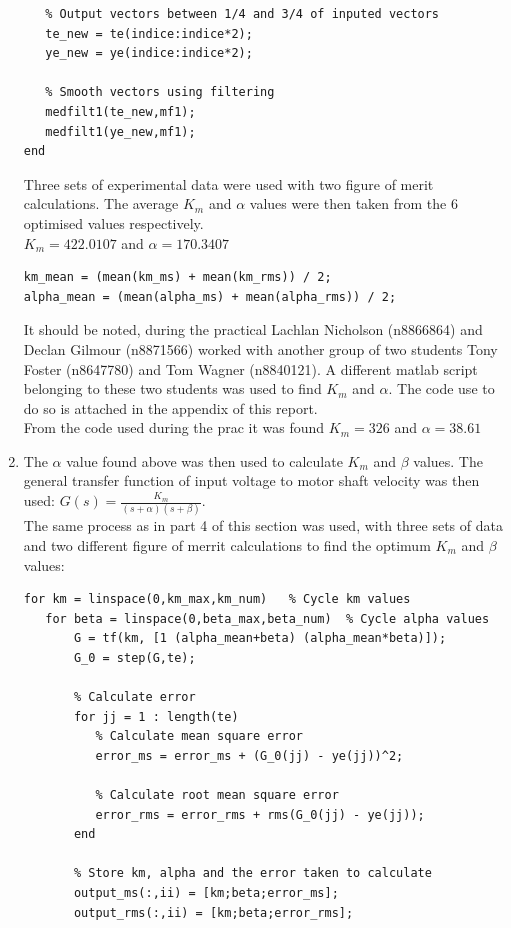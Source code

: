 \documentclass[11pt,a4paper]{article}
\begin{document}
\begin{enumerate}
\begin{lstlisting}
   % Output vectors between 1/4 and 3/4 of inputed vectors
   te_new = te(indice:indice*2);
   ye_new = ye(indice:indice*2);
   
   % Smooth vectors using filtering
   medfilt1(te_new,mf1);
   medfilt1(ye_new,mf1);   
end
	\end{lstlisting}
	Three sets of experimental data were used with two figure of merit calculations. The average $K_m$ and $\alpha$ values were then taken from the 6 optimised values respectively.\\
	$K_m = 422.0107$ and $\alpha = 170.3407$
	\begin{lstlisting}
km_mean = (mean(km_ms) + mean(km_rms)) / 2;
alpha_mean = (mean(alpha_ms) + mean(alpha_rms)) / 2;
	\end{lstlisting} 
	It should be noted, during the practical Lachlan Nicholson (n8866864) and Declan Gilmour (n8871566) worked with another group of two students Tony Foster (n8647780) and Tom Wagner (n8840121). A different matlab script belonging to these two students was used to find $K_m$ and $\alpha$. The code use to do so is attached in the appendix of this report.\\
	From the code used during the prac it was found $K_m = 326$ and $\alpha = 38.61$
\pagebreak
	\item The $\alpha$ value found above was then used to calculate $K_m$ and $\beta$ values. The general transfer function of input voltage to motor shaft velocity was then used: $G(s) = \frac{K_m}{(s+\alpha)(s+\beta)}$.\\
	The same process as in part 4 of this section was used, with three sets of data and two different figure of merrit calculations to find the optimum $K_m$ and $\beta$ values:
	\begin{lstlisting}
for km = linspace(0,km_max,km_num)   % Cycle km values
   for beta = linspace(0,beta_max,beta_num)  % Cycle alpha values
       G = tf(km, [1 (alpha_mean+beta) (alpha_mean*beta)]);
       G_0 = step(G,te);

       % Calculate error
       for jj = 1 : length(te)
          % Calculate mean square error
          error_ms = error_ms + (G_0(jj) - ye(jj))^2;

          % Calculate root mean square error
          error_rms = error_rms + rms(G_0(jj) - ye(jj));
       end

       % Store km, alpha and the error taken to calculate
       output_ms(:,ii) = [km;beta;error_ms];
       output_rms(:,ii) = [km;beta;error_rms];


\end{lstlisting}
\end{enumerate}
\end{document}
